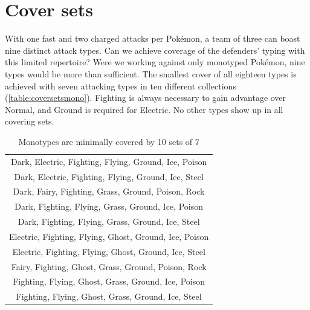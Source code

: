 \section{Cover sets\label{sec:coversets}}
With one fast and two charged attacks per Pokémon, a team of three can boast nine distinct attack types.
Can we achieve coverage of the defenders' typing with this limited repertoire?
Were we working against only monotyped Pokémon, nine types would be more than sufficient.
The smallest cover of all eighteen types is achieved with seven attacking types in
  ten different collections (\autoref{table:coversetsmono}).
Fighting is always necessary to gain advantage over Normal, and Ground is required for Electric.
No other types show up in all covering sets.
\begin{table}
  \centering
  \begin{tabular}{c}
 Dark, Electric, Fighting, Flying, Ground, Ice, Poison\\
 Dark, Electric, Fighting, Flying, Ground, Ice, Steel\\
 Dark, Fairy, Fighting, Grass, Ground, Poison, Rock\\
 Dark, Fighting, Flying, Grass, Ground, Ice, Poison\\
 Dark, Fighting, Flying, Grass, Ground, Ice, Steel\\
 Electric, Fighting, Flying, Ghost, Ground, Ice, Poison\\
 Electric, Fighting, Flying, Ghost, Ground, Ice, Steel\\
 Fairy, Fighting, Ghost, Grass, Ground, Poison, Rock\\
 Fighting, Flying, Ghost, Grass, Ground, Ice, Poison\\
 Fighting, Flying, Ghost, Grass, Ground, Ice, Steel\\
  \end{tabular}
  \caption{Monotypes are minimally covered by 10 sets of 7\label{table:coversetsmono}}
\end{table}

